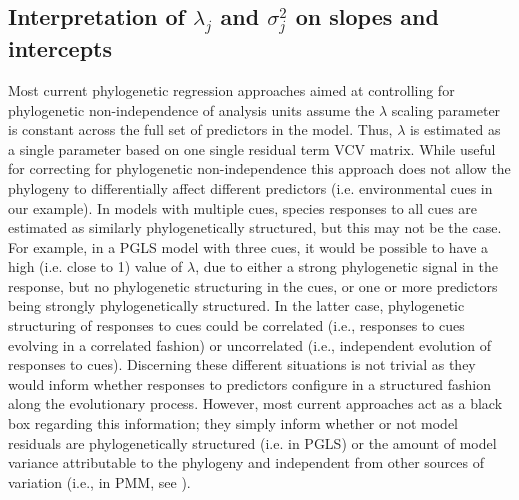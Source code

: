 \documentclass[11pt]{article}
\begin{document}
\subsection*{Interpretation of $\lambda_j$ and $\sigma_j^2$ on slopes and intercepts}

Most current phylogenetic regression approaches aimed at controlling for phylogenetic non-independence of analysis units \citep[i.e. species, see][]{revell2010phylogenetic} assume the $\lambda$ scaling parameter is constant across the full set of predictors in the model. Thus, $\lambda$ is estimated as a single parameter based on one single residual term VCV matrix. While useful for correcting for phylogenetic non-independence this approach does not allow the phylogeny to differentially affect different predictors (i.e. environmental cues in our example). In models with multiple cues, species responses to all cues are estimated as similarly phylogenetically structured, but this may not be the case. For example, in a PGLS model with three cues, it would be possible to have a high (i.e. close to 1) value of $\lambda$, due to either a strong phylogenetic signal in the response, but no phylogenetic structuring in the cues, or one or more predictors being strongly phylogenetically structured. In the latter case, phylogenetic structuring of responses to cues could be correlated (i.e., responses to cues evolving in a correlated fashion) or uncorrelated (i.e., independent evolution of responses to cues). Discerning these different situations is not trivial as they would inform whether responses to predictors configure in a structured fashion along the evolutionary process. However, most current approaches act as a black box regarding this information; they simply inform whether or not model residuals are phylogenetically structured (i.e. in PGLS) or the amount of model variance attributable to the phylogeny and independent from other sources of variation (i.e., in PMM, see \cite{housworth2004phylogenetic}).\\
\end{document}

